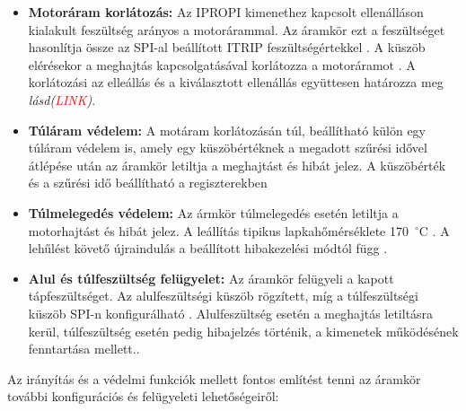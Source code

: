 \begin{itemize}
    \item \textbf{Motoráram korlátozás:}  Az IPROPI kimenethez kapcsolt ellenálláson kialakult feszültség arányos a motorárammal. 
    Az áramkör ezt a feszültséget hasonlítja össze az SPI-al beállított ITRIP feszültségértekkel \cite[18.~o., 7.5.8]{drv8244}. 
    A küszöb elérésekor a meghajtás kapcsolgatásával korlátozza a motoráramot \cite[38--39.~o., 8.3.3.3]{drv8244}. A korlátozási az elleállás és a kiválasztott ellenállás
    együttesen határozza meg \textit{lásd(\textcolor{red}{LINK})}.  
    \item \textbf{Túláram védelem:} A motáram korlátozásán túl, beállítható külön egy túláram védelem is, amely egy küszöbértéknek a megadott
    szűrési idővel átlépése után az áramkör letiltja a meghajtást és hibát jelez. A küszöbérték és a szűrési idő beállítható a regiszterekben \cite[18.~o., 7.5.9]{drv8244}
    \item \textbf{Túlmelegedés védelem:} Az ármkör túlmelegedés esetén letiltja a motorhajtást és hibát jelez. A leállítás tipikus lapkahőmérséklete
    170~$^\circ$C \cite[18.~o., 7.5.10]{drv8244}. A lehűlést követő újraindulás  a beállított hibakezelési módtól függ \cite[42--43.~o., 8.3.4.2]{drv8244}. 
    \item \textbf{Alul és túlfeszültség felügyelet:} Az áramkör felügyeli a kapott tápfeszültséget. Az alulfeszültségi küszöb rögzített,
    míg a túlfeszültségi küszöb SPI-n konfigurálható \cite[19.~o., 7.5.11]{drv8244}.  Alulfeszültség esetén a meghajtás letiltásra kerül, túlfeszültség esetén pedig 
    hibajelzés történik, a kimenetek működésének fenntartása mellett.\cite[46.~o., 8.3.4.5--8.3.4.6]{drv8244}.
\end{itemize}
Az irányítás és a védelmi funkciók mellett fontos említést tenni az áramkör további konfigurációs és felügyeleti lehetőségeiről:
